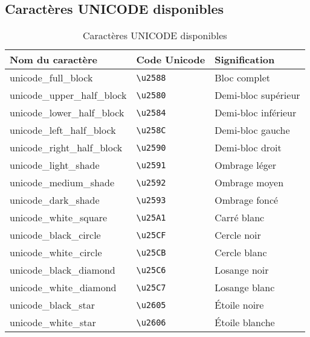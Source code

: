 \documentclass{article}
\begin{document}
\newpage
\subsection{Caractères UNICODE disponibles}
\begin{table}[h!]
    \centering
    \renewcommand{\arraystretch}{1.5} %
    \footnotesize
    \begin{tabular}{|>{\centering\arraybackslash}m{4cm}|>{\centering\arraybackslash}m{2.3cm}|>{\centering\arraybackslash}m{3cm}|}
        \hline
        \textbf{Nom du caractère} & \textbf{Code Unicode} & \textbf{Signification} \\
        \hline
        unicode\_full\_block & \texttt{\textbackslash u2588} & Bloc complet \\
        \hline
        unicode\_upper\_half\_block & \texttt{\textbackslash u2580} & Demi-bloc supérieur \\
        \hline
        unicode\_lower\_half\_block & \texttt{\textbackslash u2584} & Demi-bloc inférieur \\
        \hline
        unicode\_left\_half\_block & \texttt{\textbackslash u258C} & Demi-bloc gauche \\
        \hline
        unicode\_right\_half\_block & \texttt{\textbackslash u2590} & Demi-bloc droit \\
        \hline
        unicode\_light\_shade & \texttt{\textbackslash u2591} & Ombrage léger \\
        \hline
        unicode\_medium\_shade & \texttt{\textbackslash u2592} & Ombrage moyen \\
        \hline
        unicode\_dark\_shade & \texttt{\textbackslash u2593} & Ombrage foncé \\
        \hline
        unicode\_white\_square & \texttt{\textbackslash u25A1} & Carré blanc \\
        \hline
        unicode\_black\_circle & \texttt{\textbackslash u25CF} & Cercle noir \\
        \hline
        unicode\_white\_circle & \texttt{\textbackslash u25CB} & Cercle blanc \\
        \hline
        unicode\_black\_diamond & \texttt{\textbackslash u25C6} & Losange noir \\
        \hline
        unicode\_white\_diamond & \texttt{\textbackslash u25C7} & Losange blanc \\
        \hline
        unicode\_black\_star & \texttt{\textbackslash u2605} & Étoile noire \\
        \hline
        unicode\_white\_star & \texttt{\textbackslash u2606} & Étoile blanche \\
        \hline
    \end{tabular}
    \label{tab:unicode}
    \caption{Caractères UNICODE disponibles}
\end{table}
\end{document}
